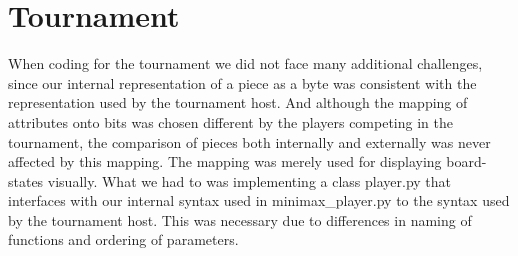 \section{Tournament}\label{tournament}
When coding for the tournament we did not face many additional challenges, since our internal representation of a \quarto{} piece as a byte was consistent with the representation used by the tournament host. And although the mapping of attributes onto bits was chosen different by the players competing in the tournament, the comparison of pieces both internally and externally was never affected by this mapping. The mapping was merely used for displaying board-states visually.
What we had to was implementing a class player.py that interfaces with our internal syntax used in minimax_player.py to the syntax used by the tournament host. This was necessary due to differences in naming of functions and ordering of parameters.